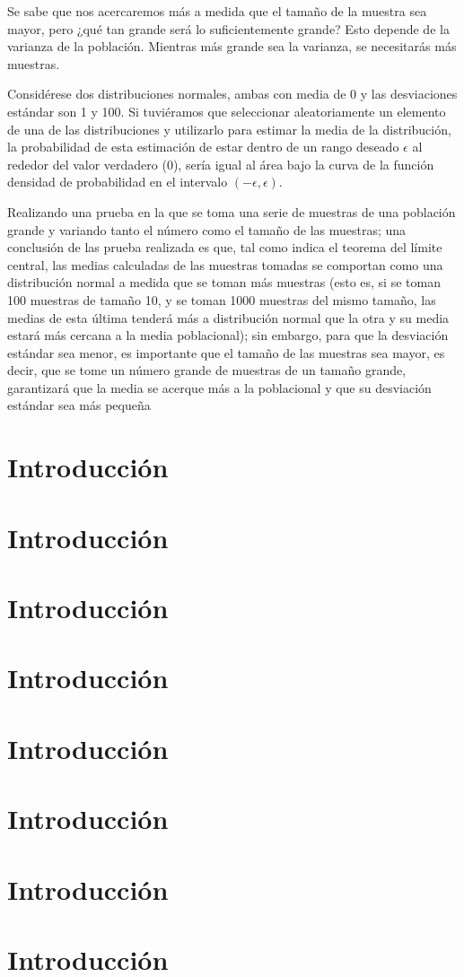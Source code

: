 Se sabe que nos acercaremos más a medida que el tamaño de la muestra sea mayor, pero ¿qué tan grande será lo suficientemente grande? Esto depende de la varianza de la población. Mientras más grande sea la varianza, se necesitarás más muestras.

Considérese dos distribuciones normales, ambas con media de 0 y las desviaciones estándar son 1 y 100. Si tuviéramos que seleccionar aleatoriamente un elemento de una de las distribuciones y utilizarlo para estimar la media de la distribución, la probabilidad de esta estimación de estar dentro de un rango deseado $\epsilon$ al rededor del valor verdadero (0), sería igual al área bajo la curva de la función densidad de probabilidad en el intervalo $(- \epsilon,\epsilon)$.

Realizando una prueba en la que se toma una serie de muestras de una población grande y variando tanto el número como el tamaño de las muestras; una conclusión de las prueba realizada es que, tal como indica el teorema del límite central, las medias calculadas de las muestras tomadas se comportan como una distribución normal a medida que se toman más muestras (esto es, si se toman 100 muestras de tamaño 10, y se toman 1000 muestras del mismo tamaño, las medias de esta última tenderá más a distribución normal que la otra y su media estará más cercana a la media poblacional); sin embargo, para que la desviación estándar sea menor, es importante que el tamaño de las muestras sea mayor, es decir, que se tome un número grande de muestras de un tamaño grande, garantizará que la media se acerque más a la poblacional y que su desviación estándar sea más pequeña








\section{Introducción}

\section{Introducción}

\section{Introducción}

\section{Introducción}

\section{Introducción}

\section{Introducción}

\section{Introducción}

\section{Introducción}


